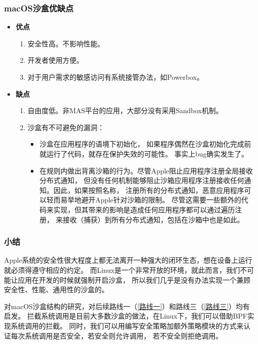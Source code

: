 \documentclass[AutoFakeBold,a4paper]{ctexart}
\begin{document}
\subsubsection{macOS沙盒优缺点}

\begin{itemize}
    \item \textbf{优点}
    \begin{enumerate}
        \item 安全性高。不影响性能。
        \item 开发者使用方便。
        \item 对于用户需求的敏感访问有系统接管办法，如Powerbox。
    \end{enumerate}
    \item \textbf{缺点}
    \begin{enumerate}
        \item 自由度低。非MAS平台的应用，大部分没有采用Sandbox机制。
        \item 沙盒有不可避免的漏洞：
        \begin{itemize}
            \item 沙盒在应用程序的语境下初始化，
            如果程序偶然在沙盒初始化完成前就运行了代码，就存在保护失效的可能性。 
            事实上bug确实发生了。\cite{blochberger2019state}
            \item 在规则内做出背离沙箱的行为。\cite{Mojave2018}尽管Apple阻止应用程序注册全局接收分布式通知，
            但没有任何机制能够阻止沙箱应用程序注册接收任何通知。因此，如果按照名称，
            注册所有的分布式通知，恶意应用程序可以轻而易举地避开Apple针对沙箱的限制。
            尽管这需要一些额外的代码来实现，但其带来的影响是造成任何应用程序都可以通过遍历注册，
            来接收（捕获）到所有分布式通知，包括在沙箱中也是如此。
        \end{itemize}
    \end{enumerate}
\end{itemize}

\subsubsection{小结}

Apple系统的安全性很大程度上都无法离开一种强大的闭环生态，想在设备上运行就必须得遵守相应的约定。
而Linux是一个非常开放的环境，就此而言，我们不可能让应用在开发的时候就强制开启沙盒，
所以我们几乎是没有办法实现一个兼顾安全性、性能、通用性的沙盒的。

对macOS沙盒结构的研究，对后续路线一（\ref{路线一}）和路线三（\ref{路线三}）均有启发。
拦截系统调用是目前大多数沙盒的做法，在Linux下，我们可以借助BPF实现系统调用的拦截。
同时，我们可以用编写安全策略加额外策略模块的方式来认证每次系统调用是否安全，若安全则允许调用，
若不安全则拒绝调用。
\end{document}
